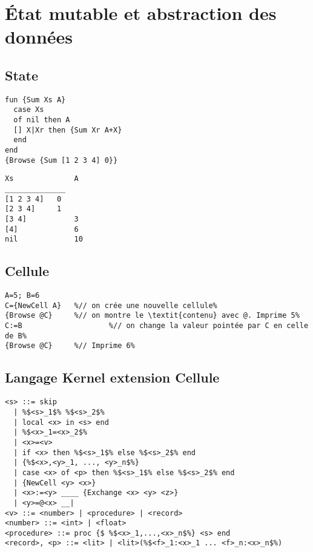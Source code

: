 \documentclass{report}
\begin{document}
\section{État mutable et abstraction des données}
\subsection{State}
\begin{center}
\begin{minipage}[t]{0.45\linewidth}
\begin{lstlisting}[escapechar=\%]
fun {Sum Xs A}
  case Xs
  of nil then A
  [] X|Xr then {Sum Xr A+X}
  end
end
{Browse {Sum [1 2 3 4] 0}}
\end{lstlisting}
\end{minipage}
%
\begin{minipage}[t]{0.45\linewidth}
\begin{lstlisting}[escapechar=\%]
Xs				A
______________
[1 2 3 4]	0
[2 3 4]		1
[3 4]			3
[4]				6
nil				10    
\end{lstlisting}
\end{minipage}
\end{center}

\subsection{Cellule}
\begin{lstlisting}[escapechar=\%]
A=5; B=6
C={NewCell A}	%// on crée une nouvelle cellule%
{Browse @C}		%// on montre le \textit{contenu} avec @. Imprime 5%
C:=B					%// on change la valeur pointée par C en celle de B%
{Browse @C}		%// Imprime 6%
\end{lstlisting}

\subsection{Langage Kernel extension Cellule}
\begin{lstlisting}[escapechar=\%]
<s> ::= skip 
  | %$<s>_1$% %$<s>_2$% 
  | local <x> in <s> end 
  | %$<x>_1=<x>_2$%
  | <x>=<v> 
  | if <x> then %$<s>_1$% else %$<s>_2$% end 
  | {%$<x>,<y>_1, ..., <y>_n$%} 
  | case <x> of <p> then %$<s>_1$% else %$<s>_2$% end 
  | {NewCell <y> <x>} 
  | <x>:=<y> ____ {Exchange <x> <y> <z>}
  | <y>=@<x> __|
<v> ::= <number> | <procedure> | <record> 
<number> ::= <int> | <float> 
<procedure> ::= proc {$ %$<x>_1,...,<x>_n$%} <s> end
<record>, <p> ::= <lit> | <lit>(%$<f>_1:<x>_1 ... <f>_n:<x>_n$%)
\end{lstlisting}
\end{document}
